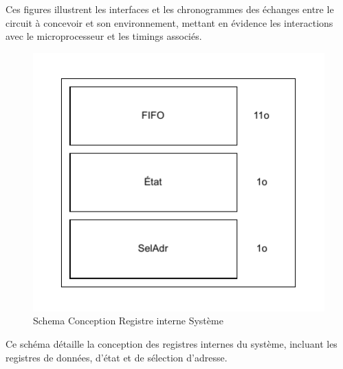 Ces figures illustrent les interfaces et les chronogrammes des échanges entre le circuit à concevoir et son environnement, mettant en évidence les interactions avec le microprocesseur et les timings associés.

\begin{figure}[H]
    \centering
    \includegraphics[width=0.8\linewidth]{images/CDC/Schema_Fifi_etat.pdf}
    \caption{Schema Conception Registre interne Système}
    \label{fig:placeholder}
\end{figure}

Ce schéma détaille la conception des registres internes du système, incluant les registres de données, d'état et de sélection d'adresse.